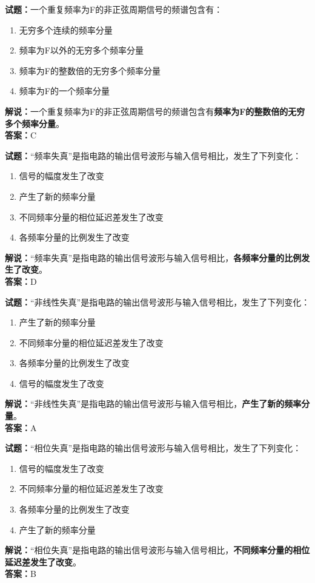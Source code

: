 \documentclass{ctexbook}
\begin{document}
\bigskip


\noindent\textbf{试题：}一个重复频率为F的非正弦周期信号的频谱包含有：
\begin{enumerate}[leftmargin=3em]
\item 无穷多个连续的频率分量	
\item 频率为F以外的无穷多个频率分量
\item 频率为F的整数倍的无穷多个频率分量
\item 频率为F的一个频率分量
\end{enumerate}
\noindent\textbf{解说：}一个重复频率为F的非正弦周期信号的频谱包含有\textbf{频率为F的整数倍的无穷多个频率分量}。\\\noindent\textbf{答案：}C




\bigskip


\noindent\textbf{试题：}“频率失真”是指电路的输出信号波形与输入信号相比，发生了下列变化：
\begin{enumerate}[leftmargin=3em]
\item 信号的幅度发生了改变
\item 产生了新的频率分量
\item 不同频率分量的相位延迟差发生了改变
\item 各频率分量的比例发生了改变
\end{enumerate}
\noindent\textbf{解说：}“频率失真”是指电路的输出信号波形与输入信号相比，\textbf{各频率分量的比例发生了改变}。\\\noindent\textbf{答案：}D




\bigskip


\noindent\textbf{试题：}“非线性失真”是指电路的输出信号波形与输入信号相比，发生了下列变化：
\begin{enumerate}[leftmargin=3em]
\item 产生了新的频率分量
\item 不同频率分量的相位延迟差发生了改变
\item 各频率分量的比例发生了改变
\item 信号的幅度发生了改变
\end{enumerate}
\noindent\textbf{解说：}“非线性失真”是指电路的输出信号波形与输入信号相比，\textbf{产生了新的频率分量}。\\\noindent\textbf{答案：}A


\bigskip


\noindent\textbf{试题：}“相位失真”是指电路的输出信号波形与输入信号相比，发生了下列变化：
\begin{enumerate}[leftmargin=3em]
\item 信号的幅度发生了改变
\item 不同频率分量的相位延迟差发生了改变
\item 各频率分量的比例发生了改变
\item 产生了新的频率分量
\end{enumerate}
\noindent\textbf{解说：}“相位失真”是指电路的输出信号波形与输入信号相比，\textbf{不同频率分量的相位延迟差发生了改变}。\\\noindent\textbf{答案：}B
\end{document}
